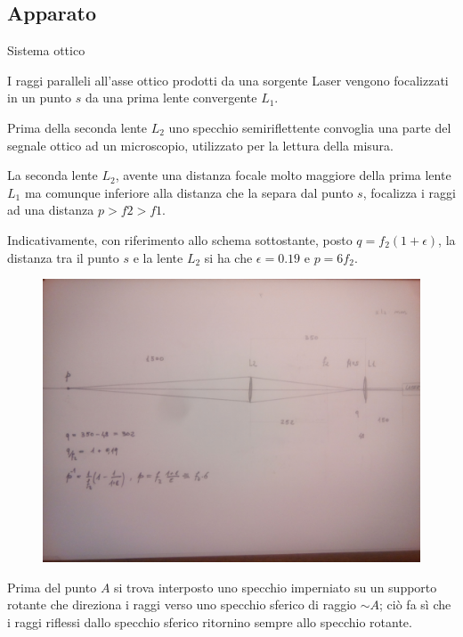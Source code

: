 \subsection{ Apparato }

Sistema ottico

I raggi paralleli all'asse ottico prodotti da una sorgente Laser vengono focalizzati in un punto $s$ da una prima lente convergente $L_{1}$.

Prima della seconda lente $L_{2}$ uno specchio semiriflettente convoglia una parte del segnale ottico ad un microscopio, utilizzato per la lettura della misura.

La seconda lente $L_{2}$, avente una distanza focale molto maggiore della prima lente $L_{1}$ ma comunque inferiore alla distanza che la separa dal punto $s$, focalizza i raggi ad una distanza $ p>f2>f1 $.

Indicativamente, con riferimento allo schema sottostante, posto $ q = f_{2}(1+\epsilon) $, la distanza tra il punto $s$ e la lente $L_{2}$ si ha che
$ \epsilon = 0.19 $ e $ p = 6 f_{2} $.

    \begin{figure}[H]
    \centering
    \includegraphics[scale=0.05]{Grafici/O1_P0_tavola1.jpg}
    \label{fig:C3_P2_RL}
    \end{figure} 

Prima del punto $A$ si trova interposto uno specchio imperniato su un supporto rotante che direziona i raggi verso uno specchio sferico di raggio $\sim A$; ciò fa sì che i raggi riflessi dallo specchio sferico ritornino sempre allo specchio rotante.



